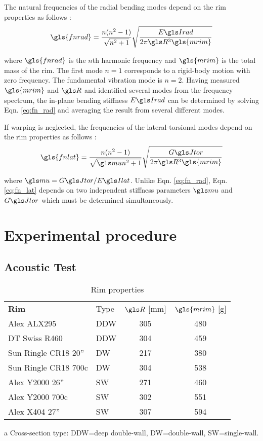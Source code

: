 \documentclass[../thesis.tex]{subfiles}
\begin{document}
The natural frequencies of the radial bending modes depend on the rim properties as follows \cite{Timoshenko1955}:
\begin{equation}\label{eq:fn_rad}
\gls{fnrad} = \frac{n(n^2-1)}{\sqrt{n^2+1}} \sqrt{\frac{\EIr}{2\pi \R^3 \gls{mrim}}}
\end{equation}

where $\gls{fnrad}$ is the $n$th harmonic frequency and $\gls{mrim}$ is the total mass of the rim. The first mode $n=1$ corresponds to a rigid-body motion with zero frequency. The fundamental vibration mode is $n=2$. Having measured $\gls{mrim}$ and $\R$ and identified several modes from the frequency spectrum, the in-plane bending stiffness $\EIr$ can be determined by solving Eqn. \eqref{eq:fn_rad} and averaging the result from several different modes.

If warping is neglected, the frequencies of the lateral-torsional modes depend on the rim properties as follows \cite{Timoshenko1955}:
\begin{equation}\label{eq:fn_lat}
\gls{fnlat} = \frac{n(n^2-1)}{\sqrt{\m n^2+1}} \sqrt{\frac{\GJ}{2\pi \R^3 \gls{mrim}}}
\end{equation}

where $\m=\GJ/\EIl$. Unlike Eqn. \eqref{eq:fn_rad}, Eqn. \eqref{eq:fn_lat} depends on two independent stiffness parameters $\m$ and $\GJ$ which must be determined simultaneously.


\section{Experimental procedure}

\subsection{Acoustic Test}

\begin{table}
\begin{threeparttable}
\caption{Rim properties}
\begin{tabular}{llcc}
\toprule
\bf{Rim} & Type\tnote{a} & $\R$ [mm] & $\gls{mrim}$ [g]\\
\noalign{\smallskip}\hline\noalign{\smallskip}
Alex ALX295          & DDW & 305 & 480\\
DT Swiss R460        & DDW & 304 & 459\\
Sun Ringle CR18 20'' & DW  & 217 & 380\\
Sun Ringle CR18 700c & DW  & 304 & 538\\
Alex Y2000 26''      & SW  & 271 & 460\\
Alex Y2000 700c      & SW  & 302 & 551\\
Alex X404 27''       & SW  & 307 & 594\\
\bottomrule
\end{tabular}
\begin{tablenotes}
\small
\item [a] Cross-section type: DDW=deep double-wall, DW=double-wall, SW=single-wall.
\end{tablenotes}
\end{threeparttable}
\end{table}
\end{document}
